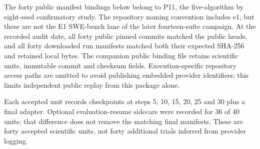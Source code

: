 \documentclass[12pt,a4paper]{report}
\begin{document}
The forty public manifest bindings below belong to P11, the
five-algorithm by eight-seed confirmatory study. The repository naming
convention includes e1, but these are not the E1 SWE-bench lane of the
later fourteen-suite campaign. At the recorded audit date, all forty
public pinned commits matched the public heads, and all forty downloaded
run manifests matched both their expected SHA-256 and retained local
bytes. The companion public binding file retains scientific units,
immutable commit and checksum fields. Execution-specific repository
access paths are omitted to avoid publishing embedded provider
identifiers; this limits independent public replay from this package
alone.

Each accepted unit records checkpoints at steps 5, 10, 15, 20, 25 and 30
plus a final adapter. Optional evaluation-resume sidecars were recorded
for 36 of 40 units; that difference does not remove the matching final
manifests. These are forty accepted scientific units, not forty
additional trials inferred from provider logging.
\end{document}
